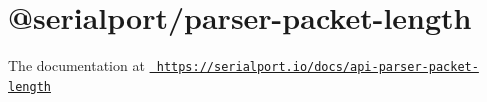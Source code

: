 \chapter{@serialport/parser-\/packet-\/length}
\hypertarget{md_Dashboard_2node__modules_2_0dserialport_2parser-packet-length_2README}{}\label{md_Dashboard_2node__modules_2_0dserialport_2parser-packet-length_2README}
\label{md_Dashboard_2node__modules_2_0dserialport_2parser-packet-length_2README_autotoc_md87}%
%
 The documentation at \href{https://serialport.io/docs/api-parser-packet-length}{\texttt{ https\+://serialport.\+io/docs/api-\/parser-\/packet-\/length}} 